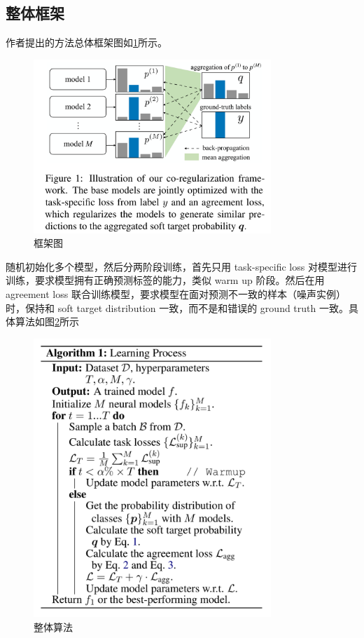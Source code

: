 \documentclass{article}
\begin{document}
\subsection{整体框架}
作者提出的方法总体框架图如\ref{framework}所示。
\begin{figure}[H]
    \centering
    \includegraphics[width=0.8\textwidth]{fig/framework.png}
    \caption{框架图}
    \label{framework}
\end{figure}

随机初始化多个模型，然后分两阶段训练，首先只用 task-specific loss 对模型进行训练，要求模型拥有正确预测标签的能力，类似 warm up 阶段。然后在用 agreement loss 联合训练模型，要求模型在面对预测不一致的样本（噪声实例）时，保持和 soft target distribution 一致，而不是和错误的 ground truth 一致。具体算法如图\ref{algorithm}所示
\begin{figure}[H]
    \centering
    \includegraphics[width=0.8\textwidth]{fig/algorithm.png}
    \caption{整体算法}
    \label{algorithm}
\end{figure}
\end{document}
